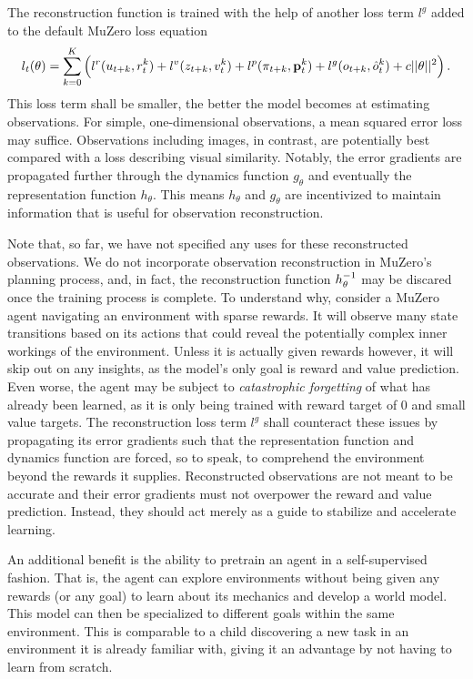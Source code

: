 The reconstruction function is trained with the help of another loss term $l^g$ added to the default MuZero loss equation
\begin{equation*}
    l_t(\theta) = \sum^K_{k=0} \left(l^r(u_{t+k}, r_t^k) + l^v(z_{t+k}, v_t^k) + l^p(\pi_{t+k}, \text{\textbf{p}}_t^k) + l^g(o_{t+k}, \hat{o}^k_t) + c||\theta||^2\right).
\end{equation*}
This loss term shall be smaller, the better the model becomes at estimating observations. For simple, one-dimensional observations, a mean squared error loss may suffice. Observations including images, in contrast, are potentially best compared with a loss describing visual similarity. Notably, the error gradients are propagated further through the dynamics function $g_\theta$ and eventually the representation function $h_\theta$. This means $h_\theta$ and $g_\theta$ are incentivized to maintain information that is useful for observation reconstruction.

Note that, so far, we have not specified any uses for these reconstructed observations. We do not incorporate observation reconstruction in MuZero's planning process, and, in fact, the reconstruction function $h^{-1}_\theta$ may be discared once the training process is complete. To understand why, consider a MuZero agent navigating an environment with sparse rewards. It will observe many state transitions based on its actions that could reveal the potentially complex inner workings of the environment. Unless it is actually given rewards however, it will skip out on any insights, as the model's only goal is reward and value prediction. Even worse, the agent may be subject to \textit{catastrophic forgetting} of what has already been learned, as it is only being trained with reward target of $0$ and small value targets. The reconstruction loss term $l^g$ shall counteract these issues by propagating its error gradients such that the representation function and dynamics function are forced, so to speak, to comprehend the environment beyond the rewards it supplies. Reconstructed observations are not meant to be accurate and their error gradients must not overpower the reward and value prediction. Instead, they should act merely as a guide to stabilize and accelerate learning.

An additional benefit is the ability to pretrain an agent in a self-supervised fashion. That is, the agent can explore environments without being given any rewards (or any goal) to learn about its mechanics and develop a world model. This model can then be specialized to different goals within the same environment. This is comparable to a child discovering a new task in an environment it is already familiar with, giving it an advantage by not having to learn from scratch.
